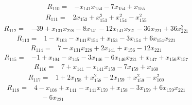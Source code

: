 \begin{equation*}\begin{split}
R_{110}={}&-x_{141} x_{154} - 7x_{154} + x_{155}
\end{split}\end{equation*}
\begin{equation*}\begin{split}
R_{111}={}&2x_{153} + x_{153}^{2} + x_{154}^{2} - x_{155}^{2}
\end{split}\end{equation*}
\begin{equation*}\begin{split}
R_{112}={}&-39 + x_{131} x_{228} - 8x_{141} - 12x_{141} x_{221} - 36x_{221} + 36x_{221}^{2}
\end{split}\end{equation*}
\begin{equation*}\begin{split}
R_{113}={}&1 - x_{103} - x_{141} x_{154} + x_{153} - 3x_{154} + 6x_{154} x_{221}
\end{split}\end{equation*}
\begin{equation*}\begin{split}
R_{114}={}&7 - x_{131} x_{228} + 2x_{141} + x_{156} - 12x_{221}
\end{split}\end{equation*}
\begin{equation*}\begin{split}
R_{115}={}&-1 + x_{104} - x_{145} - 3x_{146} - 6x_{146} x_{221} + x_{147} + x_{156} x_{157}
\end{split}\end{equation*}
\begin{equation*}\begin{split}
R_{116}={}&7 + x_{141} - x_{141} x_{159} - 7x_{159} + x_{160}
\end{split}\end{equation*}
\begin{equation*}\begin{split}
R_{117}={}&1 + 2x_{158} + x_{158}^{2} - 2x_{159} + x_{159}^{2} - x_{160}^{2}
\end{split}\end{equation*}
\begin{equation*}\begin{split}
R_{118}={}&4 - x_{108} + x_{141} - x_{141} x_{159} + x_{158} - 3x_{159} + 6x_{159} x_{221}\\
&\quad -6x_{221}
\end{split}\end{equation*}
